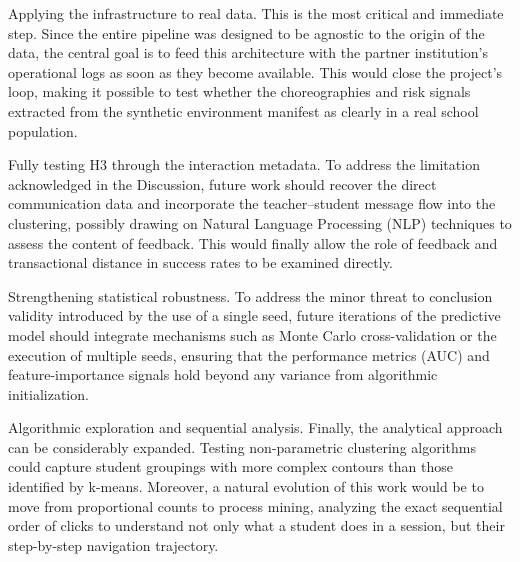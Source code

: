 Applying the infrastructure to real data. This is the most critical and immediate step. Since the entire pipeline was designed to be agnostic to the origin of the data, the central goal is to feed this architecture with the partner institution's operational logs as soon as they become available. This would close the project's loop, making it possible to test whether the choreographies and risk signals extracted from the synthetic environment manifest as clearly in a real school population.

Fully testing H3 through the interaction metadata. To address the limitation acknowledged in the Discussion, future work should recover the direct communication data and incorporate the teacher--student message flow into the clustering, possibly drawing on Natural Language Processing (NLP) techniques to assess the content of feedback. This would finally allow the role of feedback and transactional distance in success rates to be examined directly.

Strengthening statistical robustness. To address the minor threat to conclusion validity introduced by the use of a single seed, future iterations of the predictive model should integrate mechanisms such as Monte Carlo cross-validation or the execution of multiple seeds, ensuring that the performance metrics (AUC) and feature-importance signals hold beyond any variance from algorithmic initialization.

Algorithmic exploration and sequential analysis. Finally, the analytical approach can be considerably expanded. Testing non-parametric clustering algorithms could capture student groupings with more complex contours than those identified by k-means. Moreover, a natural evolution of this work would be to move from proportional counts to process mining, analyzing the exact sequential order of clicks to understand not only what a student does in a session, but their step-by-step navigation trajectory.
